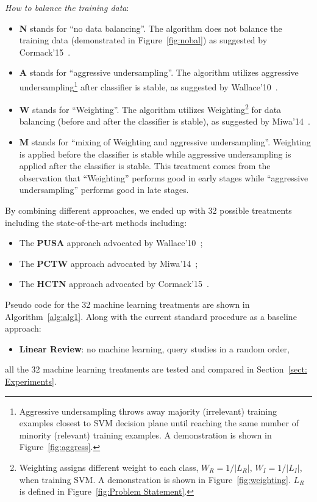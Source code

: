 \documentclass{svjour3}
\theoremstyle{break}
\begin{document}
{\em How to balance the training data}: 
\begin{itemize}
\item
\textbf{N} stands for ``no data balancing''. The algorithm does not balance the training data (demonstrated in Figure~\ref{fig:nobal}) as suggested by Cormack'15~\cite{cormack2015autonomy}.
\item
\textbf{A} stands for ``aggressive undersampling''. The algorithm utilizes aggressive undersampling\footnote{Aggressive undersampling throws away majority (irrelevant) training examples closest to SVM decision plane until reaching the same number of minority (relevant) training examples. A demonstration is shown in Figure~\ref{fig:aggress}.} after classifier is stable, as suggested by Wallace'10~\cite{wallace2010semi}.
\item
\textbf{W} stands for ``Weighting''. The algorithm utilizes Weighting\footnote{Weighting assigns different weight to each class, $W_R = 1/|L_R|,\,W_I = 1/|L_I|$, when training SVM. A demonstration is shown in Figure~\ref{fig:weighting}. $L_R$ is defined in Figure~\ref{fig:Problem Statement}.} for data balancing (before and after the classifier is stable), as suggested by Miwa'14~\cite{miwa2014reducing}.
\item
\textbf{M} stands for ``mixing of Weighting and aggressive undersampling''. Weighting is applied before the classifier is stable while aggressive undersampling is applied after the classifier is stable. This treatment comes from the observation that ``Weighting'' performs good in early stages while ``aggressive undersampling'' performs good in late stages.
\end{itemize}
By combining different approaches, we ended up with 32 possible treatments including the state-of-the-art methods including:
\begin{itemize}
\item
The \textbf{PUSA} approach advocated by Wallace'10~\cite{wallace2010semi};
\item
The \textbf{PCTW} approach advocated by Miwa'14~\cite{miwa2014reducing};
\item
The \textbf{HCTN} approach advocated by Cormack'15~\cite{cormack2015autonomy}.
\end{itemize}
Pseudo code for the 32 machine learning treatments are shown in Algorithm~\ref{alg:alg1}. Along with the current standard procedure as a baseline approach:
\begin{itemize}
\item
\textbf{Linear Review}: no machine learning, query studies in a random order,
\end{itemize}
all the 32 machine learning treatments are tested and compared in Section~\ref{sect: Experiments}.
\end{document}

